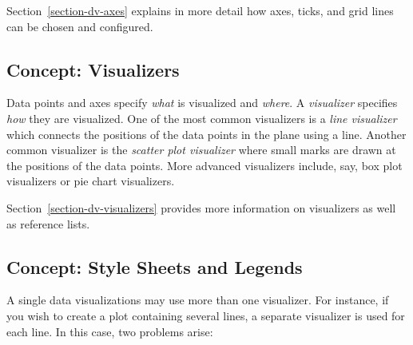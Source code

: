 Section~\ref{section-dv-axes} explains in more detail how axes, ticks,
and grid lines can be chosen and configured.


\subsection{Concept: Visualizers}

Data points and axes specify \emph{what} is visualized and
\emph{where}. A \emph{visualizer} specifies \emph{how} they are
visualized. One of the most common visualizers is a \emph{line
  visualizer} which connects the positions of the data points in the
plane using a line. Another common visualizer is the \emph{scatter
  plot visualizer} where small marks are drawn at the positions of the
data points. More advanced visualizers include, say, box plot
visualizers or pie chart visualizers.

    \begin{codeexample}[]
    \end{codeexample}
    \begin{codeexample}[]
    \end{codeexample}

Section~\ref{section-dv-visualizers} provides more information on
visualizers as well as reference lists.


\subsection{Concept: Style Sheets and Legends}

A single data visualizations may use more than one visualizer. For
instance, if you wish to create a plot containing several lines, a
separate visualizer is used for each line. In this case, two problems
arise:

